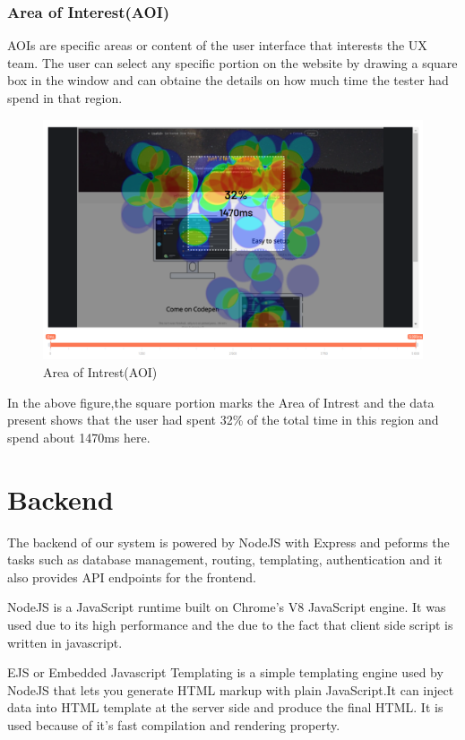 \documentclass[hidelinks,12pt,a4paper,final]{extreport}
\begin{document}
\subsubsection{Area of Interest(AOI)}
AOIs are specific areas or content of the user interface that
interests the UX team. The user can select any specific portion on the website by drawing a square box in the window and can obtaine the details on how much time the tester had spend in that region.
\begin{figure}[H]
    \centering
    \includegraphics[width=\linewidth]{AOI.png}
    \caption{Area of Intrest(AOI)}
\end{figure}
In the above figure,the square portion marks the Area of Intrest and the data present shows that the user had spent 32\% of the total time in this region and spend about 1470ms here.

\section{Backend}
The backend of our system is powered by NodeJS with Express and peforms the tasks such as database management, routing, templating, authentication and it also provides API endpoints for the frontend. 

NodeJS is a JavaScript runtime built on Chrome's V8 JavaScript engine. It was used due to its high performance and the due to the fact that client side script is written in javascript.

EJS or Embedded Javascript Templating is a simple templating engine used by NodeJS that lets you generate HTML markup with plain JavaScript.It can inject data into HTML template at the server side and produce the final HTML. It is used because of it's fast compilation and rendering property.
\end{document}
